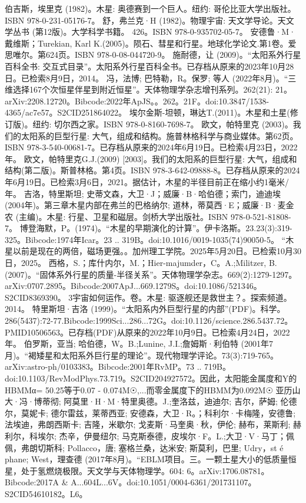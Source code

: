 \begin{enumerate}
 伯吉斯，埃里克 (1982)。木星: 奥德赛到一个巨人。纽约: 哥伦比亚大学出版社。ISBN 978-0-231-05176-7。
 舒，弗兰克·H (1982)。物理宇宙: 天文学导论。天文学丛书 (第12版)。大学科学书籍。 426。ISBN 978-0-935702-05-7。
 安德鲁·M·戴维斯；Turekian, Karl K.(2005)。陨石、彗星和行星。地球化学论文.第1卷。爱思唯尔。第624页。ISBN 978-0-08-044720-9。
 施耐德，让 (2009)。“太阳系外行星百科全书: 交互式目录”。太阳系外行星百科全书。已存档从原来的2023年10月28日。已检索8月9日，2014。
 冯，法博; 巴特勒，R。保罗; 等人 (2022年8月)。“三维选择167个次恒星伴星到附近恒星”。天体物理学杂志增刊系列。262(21): 21。arXiv:2208.12720。Bibcode:2022年ApJS。。262。21F。doi:10.3847/1538-4365/ac7e57。S2CID251864022。 
 埃尔金斯-坦顿，琳达T.(2011)。木星和土星(修订版)。纽约: 切尔西之家。ISBN 978-0-8160-7698-7。
 欧文，帕特里克 (2003)。我们的太阳系的巨型行星: 大气，组成和结构。施普林格科学与商业媒体。第62页。ISBN 978-3-540-00681-7。已存档从原来的2024年6月19日。已检索4月23日，2022年。
 欧文，帕特里克G.J.(2009) [2003]。我们的太阳系的巨型行星: 大气，组成和结构(第二版)。斯普林格。第4页。ISBN 978-3-642-09888-8。已存档从原来的2024年6月19日。已检索3月6日，2021。据估计，木星的半径目前正在缩小约1毫米/年。
 吉洛，特里斯坦; 史蒂文森，大卫·J；威廉·B·哈伯德；索门，迪迪埃 (2004年)。第三章木星内部在弗兰的巴格纳尔; 道林，蒂莫西·E；威廉·B·麦金农 (主编)。木星: 行星、卫星和磁层。剑桥大学出版社。ISBN 978-0-521-81808-7。
 博登海默，P。(1974)。“木星的早期演化的计算”。伊卡洛斯。23.23(3):319-325。Bibcode:1974年Icar。23 .. 319B。doi:10.1016/0019-1035(74)90050-5。
 “木星以前是现在的两倍，磁场更强。。加州理工学院。2025年5月20日。已检索10月30日，2025。
 西格，S.；库什内尔，M.；Hier-majumder，C。A.;Militzer, B.(2007)。“固体系外行星的质量-半径关系”。天体物理学杂志。669(2):1279-1297。arXiv:0707.2895。Bibcode:2007ApJ...669.1279S。doi:10.1086/521346。S2CID8369390。 
 3宇宙如何运作。卷。木星: 驱逐舰还是救世主？。探索频道。2014。
 特里斯坦·吉洛 (1999)。“太阳系内外巨型行星的内部”(PDF)。科学。286(5437):72-77.Bibcode:1999Sci...286...72G。doi:10.1126/science.286.5437.72。PMID10506563。已存档(PDF)从原来的2022年10月9日。已检索4月24日，2022年。  
 伯罗斯，亚当; 哈伯德，W。B.;Lunine, J.I.;詹姆斯·利伯特 (2001年7月)。“褐矮星和太阳系外巨行星的理论”。现代物理学评论。73(3):719-765。arXiv:astro-ph/0103383。Bibcode:2001年RvMP。73 .. 719B。doi:10.1103/RevModPhys.73.719。S2CID204927572。因此，太阳能金属度和Y的HBMMα= 50.25等于0.07 - 0.074M☉,...而零金属度下的HBMM为0.092M☉ 
 亚历山大·冯·博蒂彻; 阿莫里·H·M·特里奥德。J.;奎洛兹，迪迪尔; 吉尔，萨姆; 伦德尔，莫妮卡; 德尔雷兹，莱蒂西亚; 安德森，大卫·R。；科利尔·卡梅隆，安德鲁; 法埃迪，弗朗西斯卡; 吉隆，米歇尔; 戈麦斯·马奎奥·秋，伊伦; 赫布，莱斯利; 赫利尔，科埃尔; 杰辛，伊曼纽尔; 马克斯泰德，皮埃尔·F。L.;大卫·V·马丁；佩佩，弗朗切斯科; Pollacco，唐; 塞格兰桑，达米安; 斯莫利，巴里; Udry，st é phane; West，理查德 (2017年8月)。“EBLM项目。三。一颗土星大小的低质量恒星，处于氢燃烧极限。天文学与天体物理学。604: 6。arXiv:1706.08781。Bibcode:2017A & A...604L...6V。doi:10.1051/0004-6361/201731107。S2CID54610182。L6。 

\end{enumerate}
